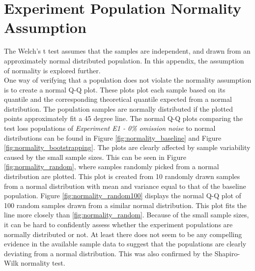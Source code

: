 \section{Experiment Population Normality Assumption}
\label{app:normality}
The Welch's t test assumes that the samples are independent, and drawn from an approximately normal distributed population. In this appendix, the assumption of normality is explored further.\\

One way of verifying that a population does not violate the normality assumption is to create a normal Q-Q plot. These plots plot each sample based on its quantile and the corresponding theoretical quantile expected from a normal distribution. The population samples are normally distributed if the plotted points approximately fit a 45 degree line. The normal Q-Q plots comparing the test loss populations of {\it Experiment E1 - 0\% omission noise} to normal distributions can be found in Figure \ref{fig:normality_baseline} and Figure \ref{fig:normality_bootstrapping}. The plots are clearly affected by sample variability caused by the small sample sizes. This can be seen in Figure \ref{fig:normality_random}, where samples randomly picked from a normal distribution are plotted.  This plot is created from 10 randomly drawn samples from a normal distribution with mean and variance equal to that of the baseline population. Figure \ref{fig:normality_random100} displays the normal Q-Q plot of 100 random samples drawn from a similar normal distribution. This plot fits the line more closely than \ref{fig:normality_random}. Because of the small sample sizes, it can be hard to confidently assess whether the experiment populations are normally distributed or not. At least there does not seem to be any compelling evidence in the available sample data to suggest that the populations are clearly deviating from a normal distribution. This was also confirmed by the Shapiro-Wilk normality test.\\

